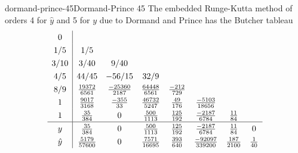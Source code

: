 \begin{Definition*}{dormand-prince-45}{Dormand-Prince 45}
  The embedded Runge-Kutta method of orders 4 for $\hat y$ and 5 for
  $y$ due to Dormand and Prince has the Butcher tableau
\begin{gather*}
  \def\arraystretch{1.3}
  \begin{array}{c|ccccccc}
    0&&&&&&&\\
    1/5  &1/5&&&&&&\\
    3/10 &3/40&9/40&&&&&\\
    4/5  &44/45&-56/15&32/9&&&&\\
    8/9  &\tfrac{19372}{6561}&\tfrac{-25360}{2187}
         &\tfrac{64448}{6561}&\tfrac{-212}{729}&&&\\
    1    &\tfrac{9017}{3168}&\tfrac{-355}{33}&\tfrac{46732}{5247}
           &\tfrac{49}{176}&\tfrac{-5103}{18656}&&\\
    1    &\tfrac{35}{384}&0&\tfrac{500}{1113}
           &\tfrac{125}{192}&\tfrac{-2187}{6784}&\tfrac{11}{84}&
    \\\hline
     y &\tfrac{35}{384}&0&\tfrac{500}{1113}&\tfrac{125}{192}
         &\tfrac{-2187}{6784}&\tfrac{11}{84}&0\\
     \hat y&\tfrac{5179}{57600}&0&\tfrac{7571}{16695}&\tfrac{393}{640}
         &\tfrac{-92097}{339200}&\tfrac{187}{2100}&\tfrac{1}{40}
  \end{array}
\end{gather*}
\end{Definition*}
